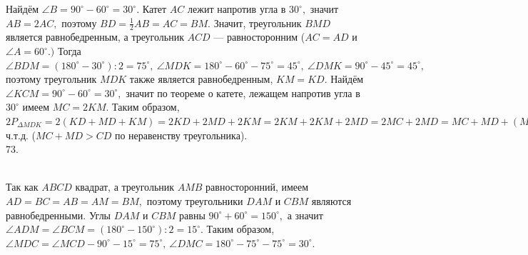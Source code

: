 \documentclass[12pt]{article}
\begin{document}
Найдём $\angle B=90^\circ-60^\circ=30^\circ.$ Катет $AC$ лежит напротив угла в $30^\circ,$ значит $AB=2AC,$ поэтому $BD=\frac{1}{2}AB=AC=BM.$ Значит, треугольник $BMD$ является равнобедренным, а треугольник $ACD$ --- равносторонним ($AC=AD$ и $\angle A=60^\circ.)$ Тогда $\angle BDM=(180^\circ-30^\circ):2=75^\circ,\ \angle MDK=180^\circ-60^\circ-75^\circ=45^\circ,\ \angle DMK=90^\circ-45^\circ=45^\circ,$ поэтому треугольник $MDK$ также является равнобедренным, $KM=KD.$ Найдём $\angle KCM=90^\circ-60^\circ=30^\circ,$ значит по теореме о катете, лежащем напротив угла в $30^\circ$ имеем $MC=2KM.$ Таким образом, $2P_{\Delta MDK}=2(KD+MD+KM)=
2KD+2MD+2KM=2KM+2KM+2MD=2MC+2MD=MC+MD+(MC+MD)>MC+MD+CD=P_{\Delta DMC},$ ч.т.д. ($MC+MD>CD$ по неравенству треугольника).\\
73. \begin{figure}[ht!]
\end{figure}\\
Так как $ABCD$ квадрат, а треугольник $AMB$ равносторонний, имеем $AD=BC=AB=AM=BM,$ поэтому треугольники $DAM$ и $CBM$ являются равнобедренными. Углы $DAM$ и $CBM$ равны $90^\circ+60^\circ=150^\circ,$ а значит $\angle ADM=\angle BCM=(180^\circ-150^\circ):2=15^\circ.$ Таким образом, $\angle MDC=\angle MCD-90^\circ-15^\circ=75^\circ,\ \angle DMC=180^\circ-75^\circ-75^\circ=30^\circ.$\\
\end{document}
